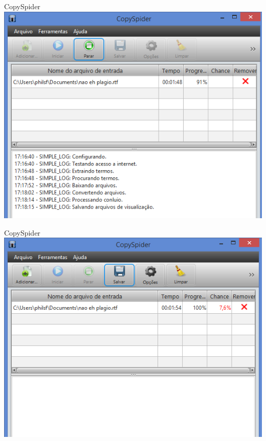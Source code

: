 \documentclass{beamer}
\begin{document}
\begin{frame}{CopySpider}
  \centering
  \includegraphics[height=.95\textheight]{Referencias/copyspider1}
\end{frame}

\begin{frame}{CopySpider}
  \centering
  \includegraphics[height=.95\textheight]{Referencias/copyspider2}
\end{frame}
\end{document}
